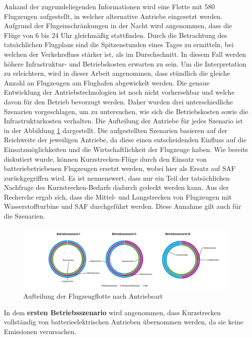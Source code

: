 Anhand der zugrundeliegenden Informationen wird eine Flotte mit 580 Flugzeugen aufgestellt, 
in welcher alternative Antriebe eingesetzt werden.
Aufgrund der Flugeinschränkungen in der Nacht wird angenommen, 
dass die Flüge von 6 bis 24 Uhr gleichmäßig stattfinden. 
%
Durch die Betrachtung des tatsächlichen Flugplans sind die Spitzenstunden eines Tages zu ermitteln, 
bei welchen der Verkehrsfluss stärker ist, als im Durschschnitt.
In diesem Fall werden höhere Infrastruktur- und Betriebskosten erwarten zu sein.
Um die Interpretation zu erleichtern, wird in dieser Arbeit angenommen, 
dass stündlich die gleiche Anzahl an Flugzeugen am Flughafen abgewickelt werden. 
%
Die genaue Entwicklung der Antriebstechnologien ist noch nicht vorhersehbar und
welche davon für den Betrieb bevorzugt werden. Daher wurden drei unterschiedliche Szenarien vorgeschlagen, 
um zu untersuchen, wie sich die Betriebskosten sowie die Infrastrukturkosten verhalten.
Die Aufteilung der Antriebe für jedes Szenario ist in der Abbildung \ref{betriebsszenarien} dargestellt.
Die aufgestellten Szenarien basieren auf der Reichweite der jeweiligen Antriebe, 
da diese einen entscheidenden Einfluss auf die Einsatzmöglichkeiten und 
die Wirtschaftlichkeit der Flugzeuge haben. 
Wie bereits diskutiert wurde, können Kurzstrecken-Flüge durch 
den Einsatz von batteriebetriebenen Flugzeugen ersetzt werden, 
wobei hier als Ersatz auf SAF zurückgegriffen wird. 
Es ist nennenswert, dass nur ein Teil der tatsächlichen Nachfrage des Kurzstrecken-Bedarfs 
dadurch gedeckt werden kann. 
Aus der Recherche ergab sich, dass die Mittel- und Langstrecken von Flugzeugen mit 
Wasserstoffturbine und SAF durchgeführt werden.
Diese Annahme gilt auch für die Szenarien. \\
%
\begin{figure}[h]
	\centering
	\includegraphics[width=1.0\linewidth]{Bilder/Betriebsszenarien.png}
	\caption[Betriebsszenarien]{Aufteilung der Flugzeugflotte nach Antriebsart}
	\label{betriebsszenarien}
\end{figure}
%
In dem \textbf{ersten Betriebsszenario} wird angenommen, dass Kurzstrecken
vollständig von batterieelektrischen Antrieben übernommen werden, da sie keine Emissionen verursachen. 
